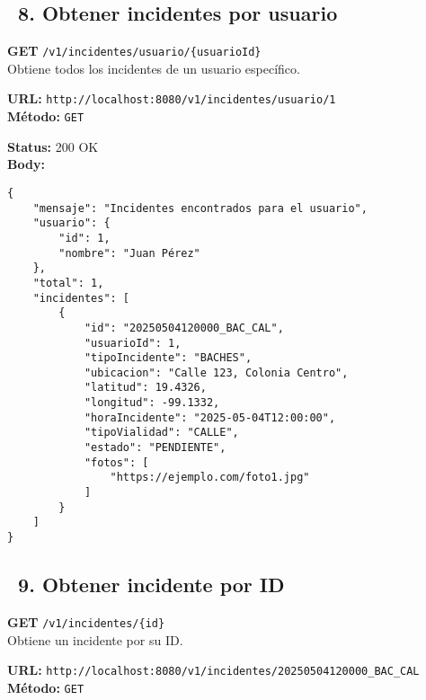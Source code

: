 \subsection*{\faServer\ 8. Obtener incidentes por usuario}
\begin{tcolorbox}[endpoint]
    \textbf{GET} \texttt{/v1/incidentes/usuario/\{usuarioId\}}\\
    Obtiene todos los incidentes de un usuario específico.
\end{tcolorbox}

\begin{tcolorbox}[request]
    \textbf{URL:} \textcolor{urlColor}{\texttt{http://localhost:8080/v1/incidentes/usuario/1}}\\
    \textbf{Método:} \textcolor{methodColor}{\texttt{GET}}
\end{tcolorbox}

\begin{tcolorbox}[response]
    \textbf{Status:} 200 OK\\
    \textbf{Body:}
    \begin{verbatim}
{
    "mensaje": "Incidentes encontrados para el usuario",
    "usuario": {
        "id": 1,
        "nombre": "Juan Pérez"
    },
    "total": 1,
    "incidentes": [
        {
            "id": "20250504120000_BAC_CAL",
            "usuarioId": 1,
            "tipoIncidente": "BACHES",
            "ubicacion": "Calle 123, Colonia Centro",
            "latitud": 19.4326,
            "longitud": -99.1332,
            "horaIncidente": "2025-05-04T12:00:00",
            "tipoVialidad": "CALLE",
            "estado": "PENDIENTE",
            "fotos": [
                "https://ejemplo.com/foto1.jpg"
            ]
        }
    ]
}
    \end{verbatim}
\end{tcolorbox}

\subsection*{\faServer\ 9. Obtener incidente por ID}
\begin{tcolorbox}[endpoint]
    \textbf{GET} \texttt{/v1/incidentes/\{id\}}\\
    Obtiene un incidente por su ID.
\end{tcolorbox}

\begin{tcolorbox}[request]
    \textbf{URL:} \textcolor{urlColor}{\texttt{http://localhost:8080/v1/incidentes/20250504120000\_BAC\_CAL}}\\
    \textbf{Método:} \textcolor{methodColor}{\texttt{GET}}
\end{tcolorbox}

